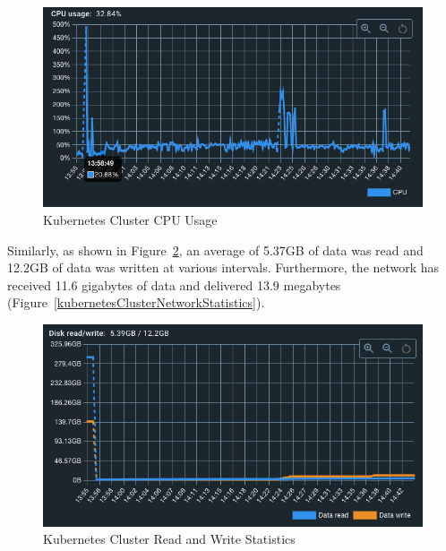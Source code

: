 \documentclass[journal]{IEEEtran}
\begin{document}
\begin{figure}[h]
  \centering
  \includegraphics[width=\columnwidth]{images/kubernetes-cluster-CPU-usage.png}
  \caption{Kubernetes Cluster CPU Usage}
  \label{kubernetesClusterCpuUsage}
\end{figure}

Similarly, as shown in Figure~\ref{kubernetesClusterReadAndWrite}, an average of 5.37GB of data was read and 12.2GB of data was written at various intervals. Furthermore, the network has received 11.6 gigabytes of data and delivered 13.9 megabytes (Figure~\ref{kubernetesClusterNetworkStatistics}).

\begin{figure}
  \centering
  \includegraphics[width=\columnwidth]{images/Kubernetes-cluster-data-read-write.png}
  \caption{Kubernetes Cluster Read and Write Statistics}
  \label{kubernetesClusterReadAndWrite}
\end{figure}
\end{document}
